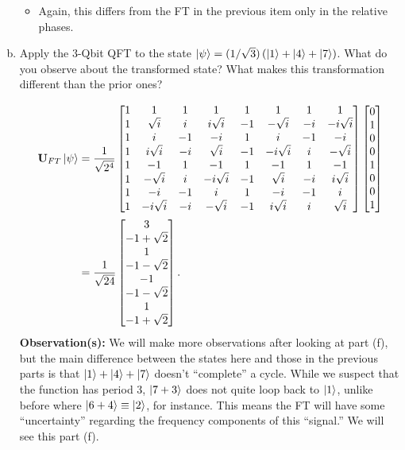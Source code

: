 \documentclass{book}
\theoremstyle{definition}
\newcommand{\nn}{\nonumber}
\newcommand{\f}[2]{\frac{#1}{#2}}
\newcommand{\lp}{\left(}
\newcommand{\rp}{\right)}
\newcommand{\lc}{\left\{}
\newcommand{\rc}{\right\}}
\newcommand{\U}{\mathbf{U}}
\begin{document}
\begin{enumerate}[(a)]
	\begin{itemize}
		\item Again, this differs from the FT in the previous item only in the relative phases. 
	\end{itemize}
	
	
	\newpage
	
	
	\item Apply the 3-Qbit QFT to the state $\ket{\psi} = (1/\sqrt{3})\lp \ket{1} + \ket{4} + \ket{7} \rp$. What do you observe about the transformed state? What makes this transformation
	different than the prior ones?

	\begin{align}
	\U_{FT}\ket{\psi} &= \f{1}{\sqrt{2^4}}\begin{bmatrix}
	1 & 1 & 1 & 1 & 1 & 1 & 1 & 1\\
	1 &\sqrt{i}&i&i\sqrt{i}&-1&-\sqrt{i}&-i&-i\sqrt{i}\\
	1&i&-1&-i&1&i&-1&-i\\
	1&i\sqrt{i}&-i&\sqrt{i}&-1&-i\sqrt{i}&i&-\sqrt{i}\\
	1 & -1 & 1 & -1 & 1 & -1 & 1 & -1\\
	1&-\sqrt{i}&i&-i\sqrt{i}&-1&\sqrt{i}&-i&i\sqrt{i}\\
	1&-i&-1&i&1&-i&-1&i\\
	1&-i\sqrt{i}&-i&-\sqrt{i}&-1&i\sqrt{i}&i&\sqrt{i}
	\end{bmatrix}
	\begin{bmatrix}
	0\\1\\0\\0\\1\\0\\0\\1
	\end{bmatrix}\nn\\
	&= \f{1}{\sqrt{24}}\begin{bmatrix}
	3\\-1+\sqrt{2}\\1\\-1-\sqrt{2}\\-1\\-1-\sqrt{2}\\1\\-1+\sqrt{2}
	\end{bmatrix}.
	\end{align}
	\textbf{Observation(s):} We will make more observations after looking at part (f), but the main difference between the states here and those in the previous parts is that $\ket{1} + \ket{4} + \ket{7}$ doesn't ``complete'' a cycle. While we suspect that the function has period 3, $\ket{7+3}$ does not quite loop back to $\ket{1}$, unlike before where $\ket{6+4} \equiv \ket{2}$, for instance. This means the FT will have some ``uncertainty'' regarding the frequency components of this ``signal.'' We will see this part (f).  \\
	

\end{enumerate}
\end{document}
